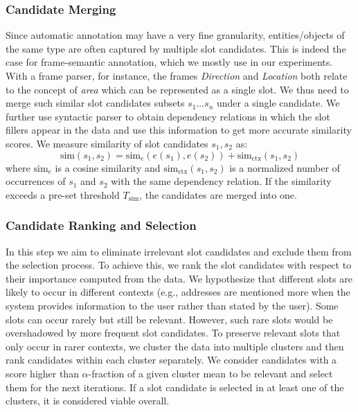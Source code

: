 \subsubsection{Candidate Merging}
\label{03:candidate_merging}
Since automatic annotation may have a very fine granularity, entities/objects of the same type are often captured by multiple slot candidates.
This is indeed the case for frame-semantic annotation, which we mostly use in our experiments.
With a frame parser, for instance, the frames \emph{Direction} and \emph{Location} both relate to the concept of \emph{area} which can be represented as a single slot.
We thus need to merge such similar slot candidates subsets $s_1 \dots s_n$ under a single candidate.
We further use syntactic parser to obtain dependency relations in which the slot fillers appear in the data and use this information to get more accurate similarity scores.
We measure similarity of slot candidates $s_1,s_2$ as:
\begin{equation}
    \text{sim}(s_1,s_2) = \text{sim}_{e}(e(s_1),e(s_2)) + \text{sim}_{\text{ctx}}(s_1,s_2)
\end{equation}
where $\text{sim}_{e}$ is a cosine similarity and $\text{sim}_{\text{ctx}}(s_1,s_2)$ is a normalized number of occurrences of $s_1$ and $s_2$ with the same dependency relation.
If the similarity exceeds a pre-set threshold $T_{\text{sim}}$, the candidates are merged into one.

\subsubsection{Candidate Ranking and Selection}
\label{03:candidate_select}
In this step we aim to eliminate irrelevant slot candidates and exclude them from the selection process.
To achieve this, we rank the slot candidates with respect to their importance computed from the data.
We hypothesize that different slots are likely to occur in different contexts (e.g., addresses are mentioned more when the system provides information to the user rather than stated by the user).
Some slots can occur rarely but still be relevant.
However, such rare slots would be overshadowed by more frequent slot candidates.
To preserve relevant slots that only occur in rarer contexts, we cluster the data into multiple clusters and then rank candidates within each cluster separately.
We consider candidates with a score higher than $\alpha$-fraction of a given cluster mean to be relevant and select them for the next iterations.
If a slot candidate is selected in at least one of the clusters, it is considered viable overall.

